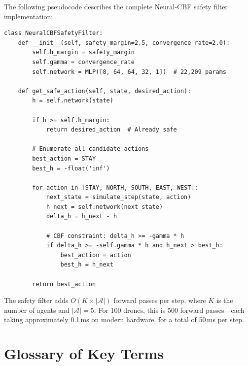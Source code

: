 \documentclass[12pt,a4paper]{article}
\DeclareRobustCommand{\cA}{\mathcal{A}}
\begin{document}
The following pseudocode describes the complete Neural-CBF safety filter implementation:

\begin{verbatim}
class NeuralCBFSafetyFilter:
    def __init__(self, safety_margin=2.5, convergence_rate=2.0):
        self.h_margin = safety_margin
        self.gamma = convergence_rate
        self.network = MLP([8, 64, 64, 32, 1])  # 22,209 params
        
    def get_safe_action(self, state, desired_action):
        h = self.network(state)
        
        if h >= self.h_margin:
            return desired_action  # Already safe
            
        # Enumerate all candidate actions
        best_action = STAY
        best_h = -float('inf')
        
        for action in [STAY, NORTH, SOUTH, EAST, WEST]:
            next_state = simulate_step(state, action)
            h_next = self.network(next_state)
            delta_h = h_next - h
            
            # CBF constraint: delta_h >= -gamma * h
            if delta_h >= -self.gamma * h and h_next > best_h:
                best_action = action
                best_h = h_next
                
        return best_action
\end{verbatim}

The safety filter adds $O(K \times |\cA|)$ forward passes per step, where $K$ is the number of agents and $|\cA| = 5$. For 100 drones, this is 500 forward passes---each taking approximately 0.1\,ms on modern hardware, for a total of 50\,ms per step.

\section{Glossary of Key Terms}
\label{app:glossary}
\end{document}
